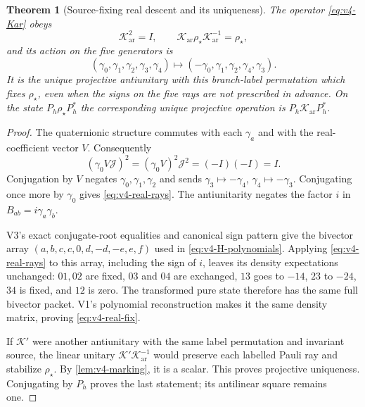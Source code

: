 \documentclass[11pt]{article}
\newtheorem{theorem}{Theorem}[section]
\theoremstyle{definition}
\theoremstyle{remark}
\newcommand{\Jq}{\mathcal J}
\begin{document}
\begin{theorem}[Source-fixing real descent and its uniqueness]
\label{thm:v4-real-descent}
The operator \eqref{eq:v4-Kar} obeys
\begin{equation}
 \boxed{\mathcal K_{\mathrm{ar}}^2=I,
 \qquad\mathcal K_{\mathrm{ar}}\rho_\star
                     \mathcal K_{\mathrm{ar}}^{-1}=\rho_\star,}
 \label{eq:v4-real-fix}
\end{equation}
and its action on the five generators is
\begin{equation}
 \boxed{
 (\gamma_0,\gamma_1,\gamma_2,\gamma_3,\gamma_4)
 \longmapsto(-\gamma_0,\gamma_1,\gamma_2,\gamma_4,\gamma_3).}
 \label{eq:v4-real-rays}
\end{equation}
It is the unique projective antiunitary with this branch-label permutation
which fixes $\rho_\star$, even when the signs on the five rays are not
prescribed in advance. On the state $P_h\rho_\star P_h^*$ the corresponding
unique projective operation is $P_h\mathcal K_{\mathrm{ar}}P_h^*$.
\end{theorem}
\begin{proof}
The quaternionic structure commutes with each $\gamma_a$ and with the
real-coefficient vector $V$. Consequently
\[
 (\gamma_0V\Jq)^2=(\gamma_0V)^2\Jq^2=(-I)(-I)=I.
\]
Conjugation by $V$ negates $\gamma_0,\gamma_1,\gamma_2$ and sends
$\gamma_3\mapsto-\gamma_4$, $\gamma_4\mapsto-\gamma_3$.
Conjugating once more by $\gamma_0$ gives
\eqref{eq:v4-real-rays}. The antiunitarity negates the factor $i$ in
$B_{ab}=i\gamma_a\gamma_b$.

V3's exact conjugate-root equalities and canonical sign pattern give the
bivector array $(a,b,c,c,0,d,-d,-e,e,f)$ used in
\eqref{eq:v4-H-polynomials}. Applying \eqref{eq:v4-real-rays} to this
array, including the sign of $i$, leaves its density expectations unchanged:
$01,02$ are fixed, $03$ and $04$ are exchanged, $13$ goes to $-14$,
$23$ to $-24$, $34$ is fixed, and $12$ is zero. The transformed pure state
therefore has the same full bivector packet. V1's polynomial reconstruction
makes it the same density matrix, proving \eqref{eq:v4-real-fix}.

If $\mathcal K'$ were another antiunitary with the same label permutation
and invariant source, the linear unitary
$\mathcal K'\mathcal K_{\mathrm{ar}}^{-1}$ would preserve each labelled
Pauli ray and stabilize $\rho_\star$. By \cref{lem:v4-marking}, it is a
scalar. This proves projective uniqueness. Conjugating by $P_h$ proves
the last statement; its antilinear square remains one.
\end{proof}
\end{document}
